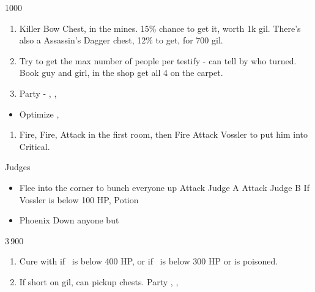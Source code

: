 \begin{shop}{1000}
\end{shop}
\begin{enumerate}
	\item Killer Bow Chest, in the mines. 15\% chance to get it, worth 1k gil. There's also a Assassin's Dagger chest, 12\% to get, for 700 gil.
	\item Try to get the max number of people per testify - can tell by who turned. Book guy and girl, in the shop get all 4 on the carpet.
	\item Party - \vaan, \balthier, \basch
\end{enumerate}
\begin{liscense}
	\begin{itemize}
	\end{itemize}
\end{liscense}
\begin{equip}
	\begin{itemize}
		\item Optimize \basch, \vaan
	\end{itemize}
\end{equip}
\begin{enumerate}
	\item Fire, Fire, Attack in the first room, then Fire Attack Vossler to put him into Critical.
\end{enumerate}
\begin{battle}{Judges}
	\begin{itemize}
		\item Flee into the corner to bunch everyone up
		      \vaanf Attack Judge A
		      \baschf Attack Judge B
		      \balthierf If Vossler is below 100 HP, Potion
		\item Phoenix Down anyone but \balthier
	\end{itemize}
\end{battle}
\begin{shop}{3\,900}
\end{shop}
\begin{enumerate}
	\item Cure with \balthier if \basch\ is below 400 HP, or if \vaan\ is below 300 HP or is poisoned.
	\item If short on gil, can pickup chests. Party \vaan, \penelo, \ashe
\end{enumerate}
